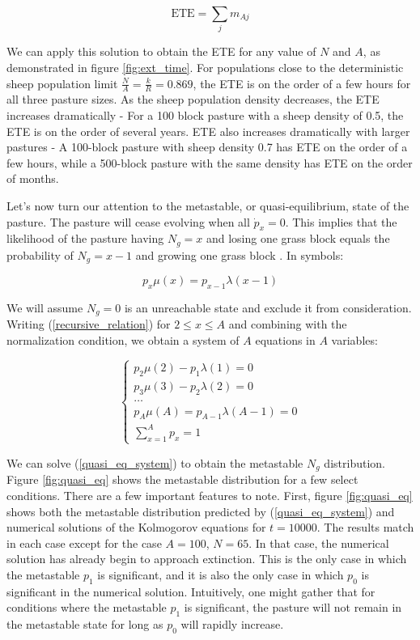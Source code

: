 \documentclass{article}
\begin{document}
$$\mathrm{ETE}=\sum_{j}m_{Aj}$$

We can apply this solution to obtain the ETE for any value of $N$ and $A$, as demonstrated in figure \ref{fig:ext_time}. For populations close to the deterministic sheep population limit $\frac{N}{A}=\frac{k}{R}=0.869$, the ETE is on the order of a few hours for all three pasture sizes. As the sheep population density decreases, the ETE increases dramatically - For a 100 block pasture with a sheep density of 0.5, the ETE is on the order of several years. ETE also increases dramatically with larger pastures - A 100-block pasture with sheep density 0.7 has ETE on the order of a few hours, while a 500-block pasture with the same density has ETE on the order of months.

Let's now turn our attention to the metastable, or quasi-equilibrium, state of the pasture. The pasture will cease evolving when all $\dot{p}_x=0$. This implies that the likelihood of the pasture having $N_g=x$ and losing one grass block equals the probability of $N_g=x-1$ and growing one grass block \cite{bartlet_gower_leslie}. In symbols:

\begin{equation}
    \label{recursive_relation}
    p_x\mu(x)=p_{x-1}\lambda(x-1)
\end{equation}

We will assume $N_g=0$ is an unreachable state and exclude it from consideration. Writing (\ref{recursive_relation}) for $2\leq x\leq A$ and combining with the normalization condition, we obtain a system of $A$ equations in $A$ variables:

\begin{equation}
    \label{quasi_eq_system}
    \begin{cases}
        p_2\mu(2)-p_1\lambda(1)=0\\
        p_3\mu(3)-p_2\lambda(2)=0\\
        \dots\\
        p_A\mu(A)=p_{A-1}\lambda(A-1)=0\\
        \sum_{x=1}^{A}p_x=1
    \end{cases}
\end{equation}

We can solve (\ref{quasi_eq_system}) to obtain the metastable $N_g$ distribution. Figure \ref{fig:quasi_eq} shows the metastable distribution for a few select conditions. There are a few important features to note. First, figure \ref{fig:quasi_eq} shows both the metastable distribution predicted by (\ref{quasi_eq_system}) and numerical solutions of the Kolmogorov equations for $t=10000$. The results match in each case except for the case $A=100$, $N=65$. In that case, the numerical solution has already begin to approach extinction. This is the only case in which the metastable $p_1$ is significant, and it is also the only case in which $p_0$ is significant in the numerical solution. Intuitively, one might gather that for conditions where the metastable $p_1$ is significant, the pasture will not remain in the metastable state for long as $p_0$ will rapidly increase.
\end{document}
